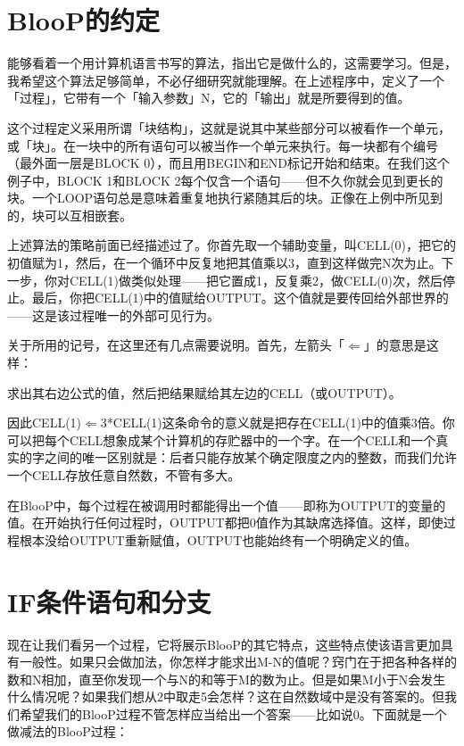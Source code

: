 \documentclass[
  12pt,
  twoside,
  openright,
  oldfontcommands,
]{memoir}
\begin{document}
\section{BlooP的约定}

能够看着一个用计算机语言书写的算法，指出它是做什么的，这需要学习。但是，我希望这个算法足够简单，不必仔细研究就能理解。在上述程序中，定义了一个「过程」，它带有一个「输入参数」N，它的「输出」就是所要得到的值。

这个过程定义采用所谓「块结构」，这就是说其中某些部分可以被看作一个单元，或「块」。在一块中的所有语句可以被当作一个单元来执行。每一块都有个编号（最外面一层是BLOCK
0），而且用BEGIN和END标记开始和结束。在我们这个例子中，BLOCK 1和BLOCK
2每个仅含一个语句------但不久你就会见到更长的块。一个LOOP语句总是意味着重复地执行紧随其后的块。正像在上例中所见到的，块可以互相嵌套。

上述算法的策略前面已经描述过了。你首先取一个辅助变量，叫CELL(0)，把它的初值赋为1，然后，在一个循环中反复地把其值乘以3，直到这样做完N次为止。下一步，你对CELL(1)做类似处理------把它置成1，反复乘2，做CELL(0)次，然后停止。最后，你把CELL(1)中的值赋给OUTPUT。这个值就是要传回给外部世界的------这是该过程唯一的外部可见行为。

关于所用的记号，在这里还有几点需要说明。首先，左箭头「$\Leftarrow$」的意思是这样：

求出其右边公式的值，然后把结果赋给其左边的CELL（或OUTPUT）。

因此CELL(1)$\Leftarrow$3*CELL(1)这条命令的意义就是把存在CELL(1)中的值乘3倍。你可以把每个CELL想象成某个计算机的存贮器中的一个字。在一个CELL和一个真实的字之间的唯一区别就是：后者只能存放某个确定限度之内的整数，而我们允许一个CELL存放任意自然数，不管有多大。

在BlooP中，每个过程在被调用时都能得出一个值------即称为OUTPUT的变量的值。在开始执行任何过程时，OUTPUT都把0值作为其缺席选择值。这样，即使过程根本没给OUTPUT重新赋值，OUTPUT也能始终有一个明确定义的值。

\section{IF条件语句和分支}

现在让我们看另一个过程，它将展示BlooP的其它特点，这些特点使该语言更加具有一般性。如果只会做加法，你怎样才能求出M-N的值呢？窍门在于把各种各样的数和N相加，直至你发现一个与N的和等于M的数为止。但是如果M小于N会发生什么情况呢？如果我们想从2中取走5会怎样？这在自然数域中是没有答案的。但我们希望我们的BlooP过程不管怎样应当给出一个答案------比如说0。下面就是一个做减法的BlooP过程：
\end{document}
